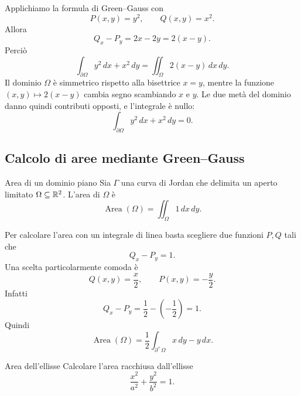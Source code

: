 \documentclass[a4paper]{article}
\begin{document}
\begin{radioactive}
\begin{snippetsolution}{}
    Applichiamo la formula di Green--Gauss con
    \[
        P(x,y)=y^2,
        \qquad
        Q(x,y)=x^2.
    \]
    Allora
    \[
        Q_x-P_y=2x-2y=2(x-y).
    \]
    Perciò
    \[
        \int_{\partial\Omega} y^2\,dx+x^2\,dy
        =
        \iint_\Omega 2(x-y)\,dx\,dy.
    \]
    Il dominio \(\Omega\) è simmetrico rispetto alla bisettrice \(x=y\), mentre la funzione \((x,y)\mapsto 2(x-y)\) cambia segno scambiando \(x\) e \(y\). Le due metà del dominio danno quindi contributi opposti, e l'integrale è nullo:
    \[
        \int_{\partial\Omega} y^2\,dx+x^2\,dy=0.
    \]
\end{snippetsolution}
\end{radioactive}

\subsection{Calcolo di aree mediante Green--Gauss}

\begin{radioactive}
\begin{snippetdefinition}{Area di un dominio piano}
    Sia \(\Gamma\) una curva di Jordan che delimita un aperto limitato \(\Omega\subseteq\mathbb{R}^2\). L'area di \(\Omega\) è
    \[
        \operatorname{Area}(\Omega)=\iint_\Omega 1\,dx\,dy.
    \]
\end{snippetdefinition}
\end{radioactive}

\begin{radioactive}
Per calcolare l'area con un integrale di linea basta scegliere due funzioni \(P,Q\) tali che
\[
    Q_x-P_y=1.
\]
Una scelta particolarmente comoda è
\[
    Q(x,y)=\frac{x}{2},
    \qquad
    P(x,y)=-\frac{y}{2}.
\]
Infatti
\[
    Q_x-P_y=\frac12-\left(-\frac12\right)=1.
\]
Quindi
\[
    \operatorname{Area}(\Omega)
    =
    \frac12\int_{\partial^+\Omega} x\,dy-y\,dx.
\]
\end{radioactive}

\begin{radioactive}
\begin{snippetexample}{Area dell'ellisse}
    Calcolare l'area racchiusa dall'ellisse
    \[
        \frac{x^2}{a^2}+\frac{y^2}{b^2}=1.
    \]
\end{snippetexample}
\end{radioactive}
\end{document}
